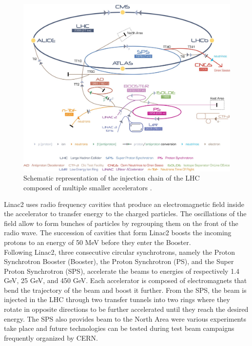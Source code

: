 		\begin{figure}[h!]
			\centering
			\includegraphics[width=\textwidth]{img/I-2-LHC/injectors.png}
			\caption{Schematic representation of the injection chain of the LHC composed of multiple smaller accelerators \Cite{TE-EPC-LPC}.}
			\label{fig:I-2-injection-chain}
		\end{figure}

    Linac2 uses radio frequency cavities that produce an electromagnetic field inside the accelerator to transfer energy to the charged particles. The oscillations of the field allow to form bunches of particles by regrouping them on the front of the radio wave. The succession of cavities that form Linac2 boosts the incoming protons to an energy of 50 MeV before they enter the Booster. \\

    Following Linac2, three consecutive circular synchrotrons, namely the Proton Synchrotron Booster (Booster), the Proton Synchrotron (PS), and the Super Proton Synchrotron (SPS), accelerate the beams to energies of respectively 1.4 GeV, 25 GeV, and 450 GeV. Each accelerator is composed of electromagnets that bend the trajectory of the beam and boost it further. From the SPS, the beam is injected in the LHC through two transfer tunnels into two rings where they rotate in opposite directions to be further accelerated until they reach the desired energy. The SPS also provides beam to the North Area were various experiments take place and future technologies can be tested during test beam campaigns frequently organized by CERN.

